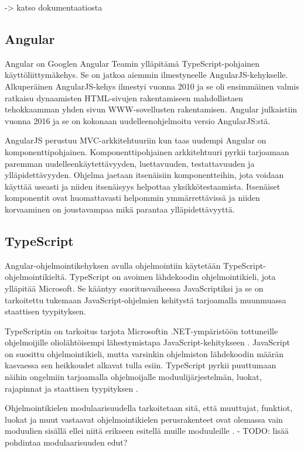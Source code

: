 \documentclass[utf8]{gradu3}
\begin{document}
 -> katso dokumentaatiosta

\subsection{Angular}

Angular on Googlen Angular Teamin ylläpitämä TypeScript-pohjainen käyttöliittymäkehys. Se on jatkoa aiemmin ilmestyneelle AngularJS-kehykselle. Alkuperäinen AngularJS-kehys ilmestyi vuonna 2010 ja se oli ensimmäinen valmis ratkaisu dynaamisten HTML-sivujen rakentamiseen mahdollistaen tehokkaamman yhden sivun WWW-sovellusten rakentamisen. Angular julkaistiin vuonna 2016 ja se on kokonaan uudelleenohjelmoitu versio AngularJS:stä.

AngularJS perustuu MVC-arkkitehtuuriin kun taas uudempi Angular on komponenttipohjainen. Komponenttipohjainen arkkitehtuuri pyrkii tarjoamaan paremman uudelleenkäytettävyyden, luettavuuden, testattavuuden ja ylläpidettävyyden. Ohjelma jaetaan itsenäisiin komponentteihin, jota voidaan käyttää useasti ja niiden itsenäisyys helpottaa yksikkötestaamista. Itsenäiset komponentit ovat huomattavasti helpommin ymmärrettävissä ja niiden korvaaminen on joustavampaa mikä parantaa ylläpidettävyyttä. \parencite[]{good-and-bad-angular}

\subsection{TypeScript}

Angular-ohjelmointikehyksen avulla ohjelmointiin käytetään TypeScript-ohjelmointikieltä. TypeScript on avoimen lähdekoodin ohjelmointikieli, jota ylläpitää Microsoft. Se kääntyy suoritusvaiheessa JavaScriptiksi ja se on tarkoitettu tukemaan JavaScript-ohjelmien kehitystä tarjoamalla muunmuassa staattisen tyypityksen. 

TypeScriptin on tarkoitus tarjota Microsoftin .NET-ympäristöön tottuneille ohjelmoijille oliolähtöisempi lähestymistapa JavaScript-kehitykseen \parencite[]{maharry-typescript}. JavaScript on suosittu ohjelmointikieli, mutta varsinkin ohjelmiston lähdekoodin määrän kasvaessa sen heikkoudet alkavat tulla esiin. TypeScript pyrkii puuttumaan näihin ongelmiin tarjoamalla ohjelmoijalle moduulijärjestelmän, luokat, rajapinnat ja staattisen tyypityksen \parencite[]{understanding-typescript}.

Ohjelmointikielen modulaarisuudella tarkoitetaan sitä, että muuttujat, funktiot, luokat ja muut vastaavat ohjelmointikielen perusrakenteet ovat olemassa vain moduulien sisällä ellei niitä erikseen esitellä muille moduuleille \parencite[]{typescript-modules}.
- TODO: lisää pohdintaa modulaarisuuden edut?
\end{document}
